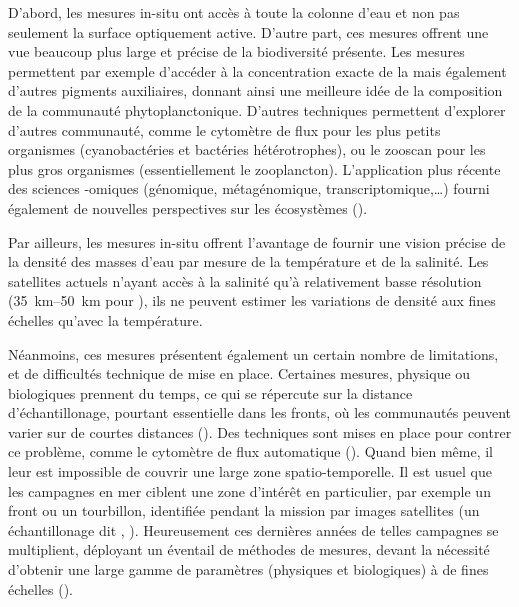 D'abord, les mesures in-situ ont accès à toute la colonne d'eau et non pas seulement la surface optiquement active.
D'autre part, ces mesures offrent une vue beaucoup plus large et précise de la biodiversité présente.
Les mesures  permettent par exemple d'accéder à la concentration exacte de la  mais également d'autres pigments auxiliaires, donnant ainsi une meilleure idée de la composition de la communauté phytoplanctonique.
D'autres techniques permettent d'explorer d'autres communauté, comme le cytomètre de flux pour les plus petits organismes (cyanobactéries et bactéries hétérotrophes), ou le zooscan pour les plus gros organismes (essentiellement le zooplancton).
L'application plus récente des sciences -omiques (génomique, métagénomique, transcriptomique,\dots) fourni également de nouvelles perspectives sur les écosystèmes (\cite{bork_2015,richter_2019,sunagawa_2020}).

Par ailleurs, les mesures in-situ offrent l'avantage de fournir une vision précise de la densité des masses d'eau par mesure de la température et de la salinité.
Les satellites actuels n'ayant accès à la salinité qu'à relativement basse résolution (\qtyrange{35}{50}{\km} pour  ), ils ne peuvent estimer les variations de densité aux fines échelles qu'avec la température.

Néanmoins, ces mesures présentent également un certain nombre de limitations, et de difficultés technique de mise en place.
Certaines mesures, physique ou biologiques  prennent du temps, ce qui se répercute sur la distance d'échantillonage, pourtant essentielle dans les fronts, où les communautés peuvent varier sur de courtes distances (\cite{chekalyuk_2012,mangolte_2023}).
Des techniques sont mises en place pour contrer ce problème, comme le cytomètre de flux automatique (\cite{thyssen_2015}).
Quand bien même, il leur est impossible de couvrir une large zone spatio-temporelle.
Il est usuel que les campagnes en mer ciblent une zone d'intérêt en particulier, par exemple un front ou un tourbillon, identifiée pendant la mission par images satellites (un échantillonage dit , \cite{marrec_2018,tzortzis_2021}).
Heureusement ces dernières années de telles campagnes se multiplient, déployant un éventail de méthodes de mesures, devant la nécessité d'obtenir une large gamme de paramètres (physiques et biologiques) à de fines échelles (\cite{shulman_2015,barcelo-llull_2021,marrec_2018,freilich_2021,tzortzis_2021,wilson_2021}).

